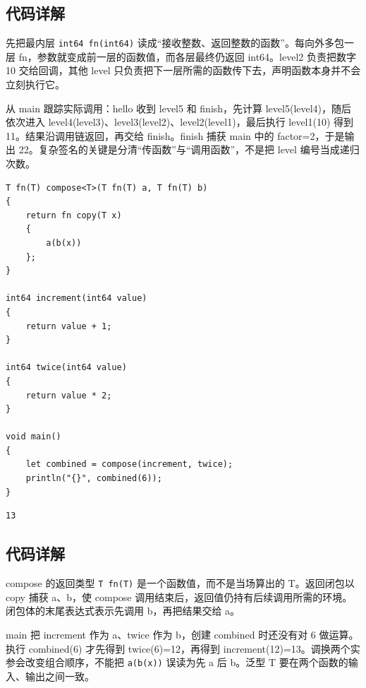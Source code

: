 \subsection*{代码详解}

先把最内层 \texttt{int64 fn(\allowbreak{}int64)\allowbreak{}} 读成“接收整数、返回整数的函数”。每向外多包一层 fn，参数就变成前一层的函数值，而各层最终仍返回 int64。level2 负责把数字 10 交给回调，其他 level 只负责把下一层所需的函数传下去，声明函数本身并不会立刻执行它。

从 main 跟踪实际调用：hello 收到 level5 和 finish，先计算 level5(level4)，随后依次进入 level4(level3)、level3(level2)、level2(level1)，最后执行 level1(10) 得到 11。结果沿调用链返回，再交给 finish。finish 捕获 main 中的 factor=2，于是输出 22。复杂签名的关键是分清“传函数”与“调用函数”，不是把 level 编号当成递归次数。

\par
\medskip
\begin{lstlisting}[style=chali]
T fn(T) compose<T>(T fn(T) a, T fn(T) b)
{
    return fn copy(T x)
    {
        a(b(x))
    };
}

int64 increment(int64 value)
{
    return value + 1;
}

int64 twice(int64 value)
{
    return value * 2;
}

void main()
{
    let combined = compose(increment, twice);
    println("{}", combined(6));
}
\end{lstlisting}
\par
\medskip

\par
\medskip
\begin{lstlisting}[style=out]
13
\end{lstlisting}
\par
\medskip

\subsection*{代码详解}

compose 的返回类型 \texttt{T fn(\allowbreak{}T)\allowbreak{}} 是一个函数值，而不是当场算出的 T。返回闭包以 copy 捕获 a、b，使 compose 调用结束后，返回值仍持有后续调用所需的环境。闭包体的末尾表达式表示先调用 b，再把结果交给 a。

main 把 increment 作为 a、twice 作为 b，创建 combined 时还没有对 6 做运算。执行 combined(6) 才先得到 twice(6)=12，再得到 increment(12)=13。调换两个实参会改变组合顺序，不能把 \texttt{a(\allowbreak{}b(\allowbreak{}x)\allowbreak{})\allowbreak{}} 误读为先 a 后 b。泛型 T 要在两个函数的输入、输出之间一致。

